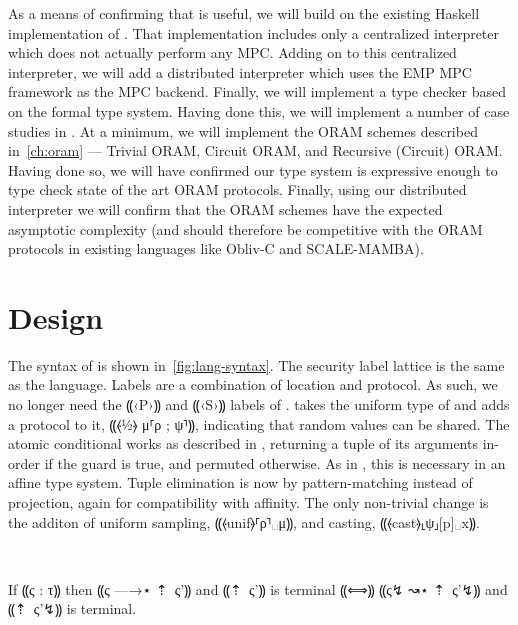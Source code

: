 As a means of confirming that \lang is useful, we will build on the existing Haskell implementation of \mpc. That implementation
includes only a centralized interpreter which does not actually perform any MPC. Adding on to this centralized interpreter, we will
add a distributed interpreter which uses the EMP MPC framework as the MPC backend. Finally, we will implement a type checker based
on the formal type system. Having done this, we will implement a number of case studies in \lang. At a minimum, we will implement
the ORAM schemes described in~\cref{ch:oram} --- Trivial ORAM, Circuit ORAM, and Recursive (Circuit) ORAM. Having done so, we will
have confirmed our type system is expressive enough to type check state of the art ORAM protocols. Finally, using our distributed
interpreter we will confirm that the ORAM schemes have the expected asymptotic complexity (and should therefore be competitive with
the ORAM protocols in existing languages like Obliv-C and SCALE-MAMBA).

\section{Design}

The syntax of \lang is shown in~\cref{fig:lang-syntax}. The security label lattice is the same as
the \mpc language. Labels are a combination of location and protocol. As such, we no longer need the ⸨‹P›⸩ and ⸨‹S›⸩ labels
of \obliv. \lang takes the uniform type of \obliv and adds a protocol to it, ⸨⦑½⦒ μ⸢ρ ; ψ⸣⸩, indicating that random values
can be shared. The atomic conditional works as described in \obliv, returning a tuple of its arguments in-order if the guard
is true, and permuted otherwise. As in \obliv, this is necessary in an affine type system. Tuple elimination is now by
pattern-matching instead of projection, again for compatibility with affinity. The only non-trivial change is the additon of
uniform sampling, ⸨⦑unif⦒⸢ρ⸣␣μ⸩, and casting, ⸨⦑cast⦒⸤ψ⸥[p]␣x⸩.

 \\


\begin{theorem}\label{thm:lang-simulation}
    If ⸨ς : τ⸩ then ⸨ς —→⋆ ⇡~{ς'}⸩ and ⸨⇡~{ς'}⸩ is terminal ⸨⟺⸩ ⸨ς↯ ↝⋆ ⇡~{ς'}↯⸩ and ⸨⇡~{ς'}↯⸩ is terminal.
\end{theorem}

